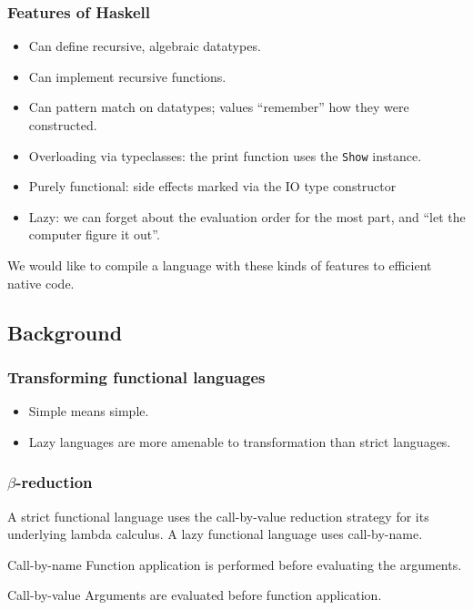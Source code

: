 \documentclass{beamer}
\begin{document}
\begin{frame}
    \frametitle{Features of Haskell}

    \begin{itemize}
        \item
            Can define recursive, algebraic datatypes.
        \item
            Can implement recursive functions.
        \item
            Can pattern match on datatypes; values ``remember'' how they were
            constructed.
        \item
            Overloading via typeclasses: the print function uses the
            \texttt{Show} instance.
        \item
            Purely functional: side effects marked via the IO type constructor
        \item
            Lazy: we can forget about the evaluation order for the most part,
            and ``let the computer figure it out''.
    \end{itemize}

    We would like to compile a language with these kinds of features to
    efficient native code.
\end{frame}

\subsection{Background}

\begin{frame}
    \frametitle{Transforming functional languages}

    \begin{itemize}
        \item
            Simple means simple.

        \item
            Lazy languages are more amenable to transformation than strict
            languages.
    \end{itemize}
\end{frame}

\begin{frame}
    \frametitle{$\beta$-reduction}

    A strict functional language uses the \alert{call-by-value} reduction
    strategy for its underlying lambda calculus. A lazy functional language
    uses \alert{call-by-name}.

    \begin{block}{Call-by-name}
        Function application is performed before evaluating the arguments.
    \end{block}

    \begin{block}{Call-by-value}
        Arguments are evaluated before function application.
    \end{block}
\end{frame}
\end{document}
